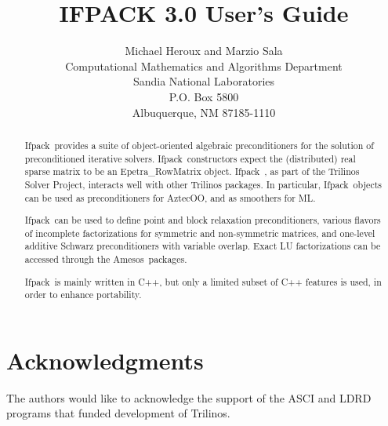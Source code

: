 \documentclass[11pt,relax]{SANDreport}
\author{Michael Heroux and Marzio Sala \\
Computational Mathematics and Algorithms Department \\
Sandia National Laboratories \\
P.O. Box 5800 \\
Albuquerque, NM 87185-1110
}
\title{IFPACK 3.0 User's Guide}
\newcommand{\ifpack}{{\sc Ifpack}}
\newcommand{\aztecoo}{{\sc AztecOO}}
\newcommand{\amesos}{{\sc Amesos}}
\newcommand{\ml}{{\sc ML}}
\begin{document}
\maketitle

\begin{abstract}
\ifpack~provides a suite of object-oriented algebraic preconditioners
for the solution of preconditioned iterative solvers.  \ifpack~constructors 
expect the (distributed) real sparse matrix to be an Epetra\_RowMatrix object.
\ifpack~, as part of the Trilinos Solver Project,
interacts well with other Trilinos packages. In particular, \ifpack~objects
can be used as preconditioners for \aztecoo, and as smoothers for \ml. 

\ifpack\ can be used to define point and block relaxation preconditioners,
  various flavors of incomplete factorizations for symmetric and non-symmetric
  matrices, and one-level additive Schwarz preconditioners with variable
  overlap. Exact LU factorizations can be accessed through the \amesos\
  packages.

\ifpack\ is mainly written in C++, but only  a limited subset of C++ features
is used, in order to enhance portability.
\end{abstract}

\clearpage
\section*{Acknowledgments}
The authors would like to acknowledge the support of the ASCI and LDRD programs
that funded development of Trilinos.

\medskip

\SANDmain

\tableofcontents

\clearpage
\newpage




\end{document}
